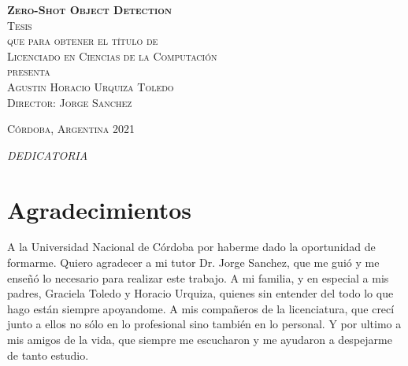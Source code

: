 \documentclass[12pt,twosided]{book}
\begin{document}
\begin{titlepage}
\begin{center}
\vspace{1em}

\textsc{\huge \textbf{Zero-Shot Object Detection}}\\[2em]

\textsc{\large Tesis}\\[1em]

\textsc{que para obtener el título de}\\[1em]

\textsc{Licenciado en Ciencias de la Computación}\\[1em]

\textsc{presenta}\\[1em]

\textsc{\Large Agustin Horacio Urquiza Toledo}\\[1em]

\textsc{\large Director: Jorge Sanchez}

\end{center}

\vspace*{\fill}
\textsc{Córdoba, Argentina \hspace*{\fill} 2021}

\end{titlepage}

\pagestyle{empty}
\frontmatter

\begin{flushright}
\textit{DEDICATORIA}
\end{flushright}


\chapter*{Agradecimientos}
A la Universidad Nacional de Córdoba por haberme dado la
oportunidad de formarme. Quiero agradecer a mi tutor Dr. Jorge Sanchez, que me guió y me enseñó lo necesario para realizar este trabajo. A mi familia, y en especial a mis padres, Graciela Toledo y Horacio Urquiza, quienes sin entender del todo lo que hago están siempre apoyandome. A mis compañeros de la licenciatura, que crecí junto a ellos no sólo en lo profesional sino también en lo personal. Y por ultimo a mis amigos de la vida, que siempre me escucharon y me ayudaron a despejarme de tanto estudio.
\end{document}
